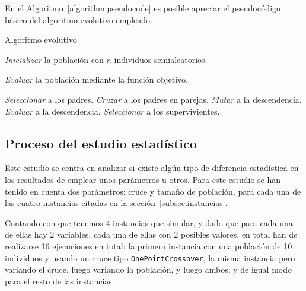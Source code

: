 En el Algoritmo~\ref{algorithm:pseudocode} es posible apreciar el pseudocódigo básico del algoritmo evolutivo empleado.

\begin{algorithm}
    \caption{Algoritmo evolutivo}
    \label{algorithm:pseudocode}
    
    \begin{algorithmic}[1]
        \State \textit{Inicializar} la población con $n$ individuos semialeatorios. 
        
        \State \textit{Evaluar} la población mediante la función objetivo.
        
            \State \textit{Seleccionar} a los padres. 
            \State \textit{Cruzar} a los padres en parejas. 
            \State \textit{Mutar} a la descendencia. 
            \State \textit{Evaluar} a la descendencia.
            \State \textit{Seleccionar} a los supervivientes.  
        \EndWhile
    \end{algorithmic}
\end{algorithm}


\subsection{Proceso del estudio estadístico}
\label{subsec:proceso-estudio}

Este estudio se centra en analizar si existe algún tipo de diferencia estadística en los resultados de emplear unos parámetros u otros. Para este estudio se han tenido en cuenta dos parámetros: cruce y tamaño de población, para cada una de las cuatro instancias citadas en la sección~\ref{subsec:instancias}.

Contando con que tenemos 4 instancias que simular, y dado que para cada una de ellas hay 2 variables, cada una de ellas con 2 posibles valores, en total han de realizarse 16 ejecuciones en total: la primera instancia con una población de 10 individuos y usando un cruce tipo \texttt{OnePointCrossover}, la misma instancia pero variando el cruce, luego variando la población, y luego ambos; y de igual modo para el resto de las instancias.

